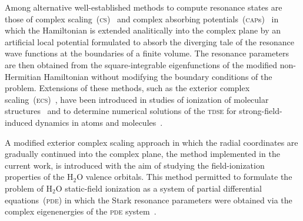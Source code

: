 Among alternative well-established methods to compute resonance states
are those of complex scaling~(\textsc{cs})~\cite{complexScalingSimon}
and complex absorbing potentials~(\textsc{cap}s)~\cite{RissMeyer_1993}
in which the Hamiltonian is extended analitically into the complex
plane by an artificial local potential formulated to absorb the
diverging tale of the resonance wave functions at the boundaries of a
finite volume. The resonance parameters are then obtained from the
square-integrable eigenfunctions of the modified non-Hermitian
Hamiltonian without modifying the boundary conditions of the
problem. Extensions of these methods, such as the exterior complex
scaling~(\textsc{ecs})~\cite{Simon_1979}, have been introduced in
studies of ionization of molecular
structures~\cite{ScrinziJChemPhys_ECS,ScrinziJPhysB_ECS} and to
determine numerical solutions of the \textsc{tdse} for
strong-field-induced dynamics in atoms and
molecules~\cite{Krause_2014,ecsScrinzi,ecsRuiz}.


A modified exterior complex scaling approach in which the radial
coordinates are gradually continued into the complex plane, the method
implemented in the current work, is introduced with the aim of
studying the field-ionization properties of the H$_{2}$O valence
orbitals. This method permitted to formulate the problem of H$_{2}$O
static-field ionization as a system of partial differential
equations~(\textsc{pde}) in which the Stark resonance parameters were
obtained via the complex eigenenergies of the \textsc{pde}
system~\cite{sarias_2016,sarias_2017}.



